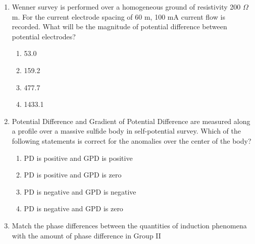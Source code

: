 \documentclass[journal,12pt,onecolumn]{IEEEtran}
\theoremstyle{remark}
\begin{document}
\begin{enumerate}
    \item Wenner survey is performed over a homogeneous ground of resistivity 200 $\Omega$m. For the current electrode spacing of 60 m, 100 mA current flow is recorded. What will be the magnitude of potential difference  between potential electrodes?

    \hfill{}
    
    \begin{multicols}{2}
        \begin{enumerate}
            \item 53.0
            \item 159.2
            \item 477.7
            \item 1433.1
        \end{enumerate}
    \end{multicols}

    \item Potential Difference  and Gradient of Potential Difference  are measured along a profile over a massive sulfide body in self-potential survey. Which of the following statements is correct for the anomalies over the center of the body?

    \hfill{}
    
    \begin{multicols}{1}
        \begin{enumerate}
            \item PD is positive and GPD is positive
            \item PD is positive and GPD is zero
            \item PD is negative and GPD is negative
            \item PD is negative and GPD is zero
        \end{enumerate}
    \end{multicols}

    \item Match the phase differences between the quantities of induction phenomena  with the amount of phase difference in Group II

    \hfill{}
    

\end{enumerate}
\end{document}
